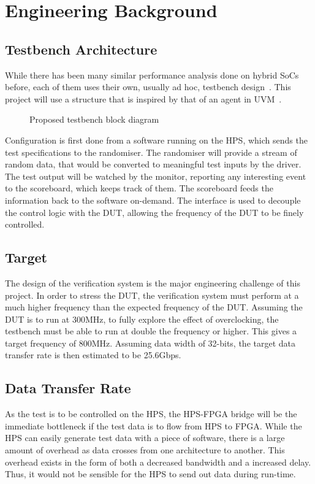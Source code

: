 \section{Engineering Background}

\subsection{Testbench Architecture}

While there has been many similar performance analysis done on hybrid SoCs
before, each of them uses their own, usually ad hoc, testbench
design~\cite{Shi1}.
This project will use a structure that is inspired by that of an agent in
UVM~\cite{Accellera1}.

\begin{figure}[H]
  \centering
  
  \caption{Proposed testbench block diagram}
  \label{Block}
\end{figure}

Configuration is first done from a software running on the HPS, which sends
the test specifications to the randomiser.
The randomiser will provide a stream of random data, that would be converted
to meaningful test inputs by the driver.
The test output will be watched by the monitor, reporting any interesting
event to the scoreboard, which keeps track of them.
The scoreboard feeds the information back to the software on-demand.
The interface is used to decouple the control logic with the DUT, allowing
the frequency of the DUT to be finely controlled.

\subsection{Target}
The design of the verification system is the major engineering challenge of this
project.
In order to stress the DUT, the verification system must perform at a much
higher frequency than the expected frequency of the DUT.
Assuming the DUT is to run at 300MHz, to fully explore the effect of
overclocking, the testbench must be able to run at double the frequency or
higher.
This gives a target frequency of 800MHz.
Assuming data width of 32-bits, the target data transfer rate is then 
estimated to be 25.6Gbps.

\subsection{Data Transfer Rate}
As the test is to be controlled on the HPS, the HPS-FPGA bridge will be the
immediate bottleneck if the test data is to flow from HPS to FPGA.
While the HPS can easily generate test data with a piece of software,
there is a large amount of overhead as data crosses from one architecture
to another.
This overhead exists in the form of both a decreased bandwidth and a increased
delay.
Thus, it would not be sensible for the HPS to send out data during run-time.

